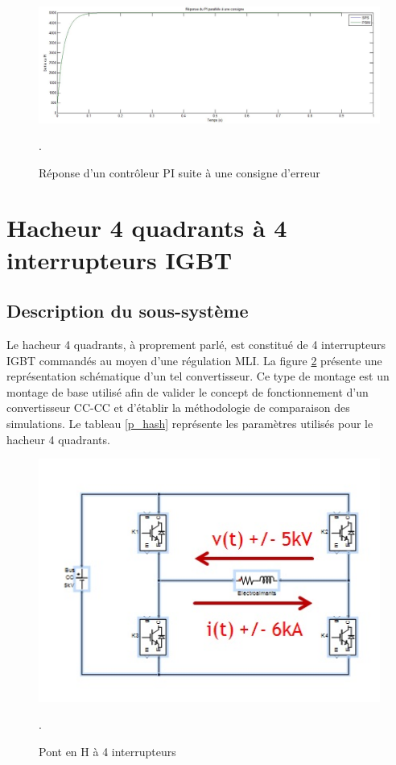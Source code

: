 \documentclass[11pt,letterpaper,final]{report}
\begin{document}
\begin{figure}[htb]
\centering
\includegraphics[scale=0.5]{Fig/Comp/PI.jpg}
\caption{Réponse d'un contrôleur PI suite à une consigne d'erreur}.
\label{PI}
\end{figure}

\clearpage
\section{Hacheur 4 quadrants à 4 interrupteurs IGBT}
\subsection{Description du sous-système}
Le hacheur 4 quadrants, à proprement parlé, est constitué de 4 interrupteurs IGBT commandés au moyen d'une régulation MLI. La figure \ref{hach} présente une représentation schématique d'un tel convertisseur. Ce type de montage est un montage de base utilisé afin de valider le concept de fonctionnement d'un convertisseur CC-CC et d'établir la méthodologie de comparaison des simulations. Le tableau \ref{p_hash} représente les paramètres utilisés pour le hacheur 4 quadrants.

\begin{figure}[htb]
\centering
\includegraphics[scale=1]{Fig/Hacheur4Quadrants/Hacheur.jpg}
\caption{Pont en H à 4 interrupteurs}.
\label{hach}
\end{figure}
\end{document}
